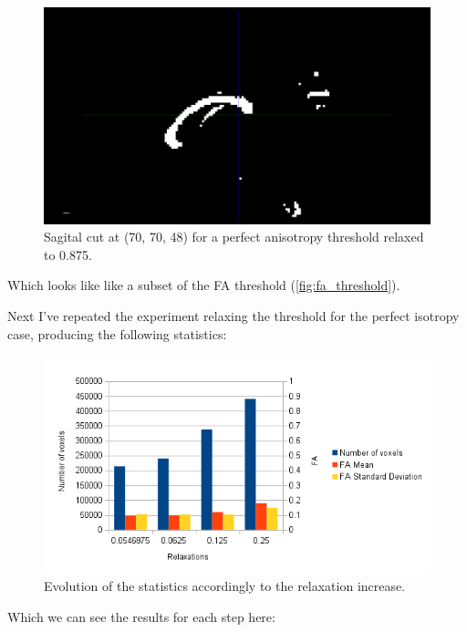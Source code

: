 \documentclass[a4paper,11pt]{report}
\begin{document}
      \begin{figure}[H]
        \includegraphics[width=1\linewidth]{imgs/eg_10_10_00_0875.png}
        \caption{Sagital cut at (70, 70, 48) for a perfect anisotropy threshold relaxed to 0.875.}
        \label{fig:perf-ani-0875}
      \end{figure}

      Which looks like like a subset of the FA threshold (\ref{fig:fa_threshold}).

      Next I've repeated the experiment relaxing the threshold for the perfect isotropy case, producing the following statistics:

      \begin{figure}[H]
        \includegraphics[width=1\linewidth]{imgs/perfect_isotropy_relaxed_chart.png}
        \caption{Evolution of the statistics accordingly to the relaxation increase.}
        \label{fig:perf-ani-chart}
      \end{figure}

      Which we can see the results for each step here:
\end{document}
